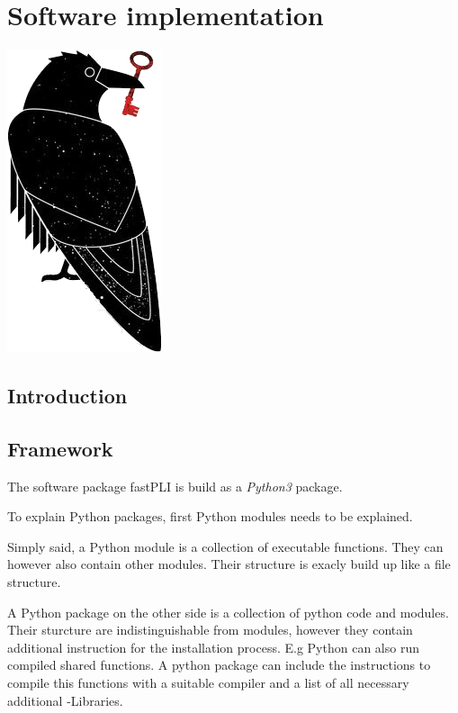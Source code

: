 \setcounter{chapter}{3}
\chapter{Software implementation}
\label{Software}
% 
\includegraphics[width=.075\textwidth]{gfx/Scihub_raven.png}
% 

% 
%
\cite{pybind11}

\section{Introduction}

\section{Framework}
The software package \ac{fastPLI} is build as a \textit{Python3} \cite{Python3} package.

To explain Python packages, first Python modules needs to be explained.

Simply said, a Python module is a collection of executable functions.
They can however also contain other modules.
Their structure is exacly build up like a file structure. 

A Python package on the other side is a collection of python code and modules.
Their sturcture are indistinguishable from modules, however they contain additional instruction for the installation process.
E.g Python can also run compiled shared \CCXX{} functions.
A python package can include the instructions to compile this functions with a suitable \CCXX{} compiler and a list of all necessary additional \CCXX{}-Libraries.

